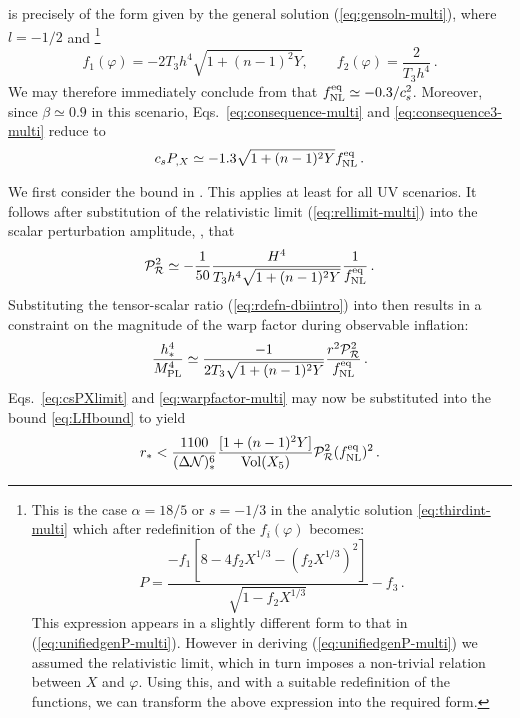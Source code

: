  is precisely of the form given by the 
general solution (\ref{eq:gensoln-multi}), where $l=-1/2$ and
\footnote{This is the case $\alpha =18/5$ or $s=-1/3$ in the analytic solution
\eqref{eq:thirdint-multi} which after redefinition of the $f_i (\varphi)$
becomes:
% 
\begin{equation}
P = \frac{-f_1\left[8 - 4f_2X^{1/3}
-\left(f_2X^{1/3}\right)^2\right]}{\sqrt{1-f_2X^{1/3}}} -f_3 \, .
\end{equation}
% 
This expression appears in a slightly different 
form to that in (\ref{eq:unifiedgenP-multi}). 
However in deriving (\ref{eq:unifiedgenP-multi}) we assumed the
relativistic limit, which in turn imposes a non-trivial 
relation between $X$ and $\varphi$. Using this, and with a 
suitable redefinition of the functions, we can
transform the above expression into the required form.} 
% 
\begin{equation}
\label{eq:fdefns-multi}
f_1 (\varphi) = -2T_3 h^4 \sqrt{1+(n-1)^2Y} , \qquad 
f_2 (\varphi) = \frac{2}{T_3 h^4} \,.
\end{equation}
% 
We may therefore immediately conclude from  that
$f_{\mathrm{NL}}^{\mathrm{eq}}
\simeq -0.3/c_s^2$. Moreover, since $\beta \simeq 0.9$ in this scenario, 
Eqs.~\eqref{eq:consequence-multi} and \eqref{eq:consequence3-multi} reduce to  
% 
\begin{equation}
\label{eq:csPXlimit}
c_sP_{,X} \simeq -1.3 \sqrt{1+(n-1)^2Y} f_{\mathrm{NL}}^{\mathrm{eq}} \,.
\end{equation}
% 


We first consider the bound in . This applies at least for all
UV scenarios. It follows after substitution of the relativistic limit
(\ref{eq:rellimit-multi}) into the scalar perturbation amplitude,
,
that 
% 
\begin{equation}
\label{eq:usefulPs-multi}
\mathcal{P}_{\mathcal{R}}^2  \simeq -\frac{1}{50} \frac{H^4}{T_3 h^4\sqrt{1+(n-1)^2Y}}
\frac{1}{f_{\mathrm{NL}}^{\mathrm{eq}}}\,.
\end{equation}
% 
Substituting the tensor-scalar ratio (\ref{eq:rdefn-dbiintro}) into  
 then results in a constraint on the magnitude of 
the warp factor during observable inflation:
%  
\begin{equation}
\label{eq:warpfactor-multi}
\frac{h^4_*}{M_{\mathrm{PL}}^4} \simeq \frac{-1}{2 T_3 \sqrt{1+(n-1)^2Y}} 
\frac{r^2 \mathcal{P}_{\mathcal{R}}^2 }{f_{\mathrm{NL}}^{\mathrm{eq}}} \,.
\end{equation}
% 
Eqs.~\eqref{eq:csPXlimit} and \eqref{eq:warpfactor-multi} may now be
substituted into 
the bound \eqref{eq:LHbound} to yield
%  
\begin{equation}
\label{eq:actualLH-multi}
r_* < \frac{1100}{(\Delta \mathcal{N} )_*^6} 
\frac{[1+(n-1)^2Y]}{\mathrm{Vol} (X_5)} \mathcal{P}_{\mathcal{R}}^2  (f_{\mathrm{NL}}^{\mathrm{eq}})^2 \,.
\end{equation}
% 


